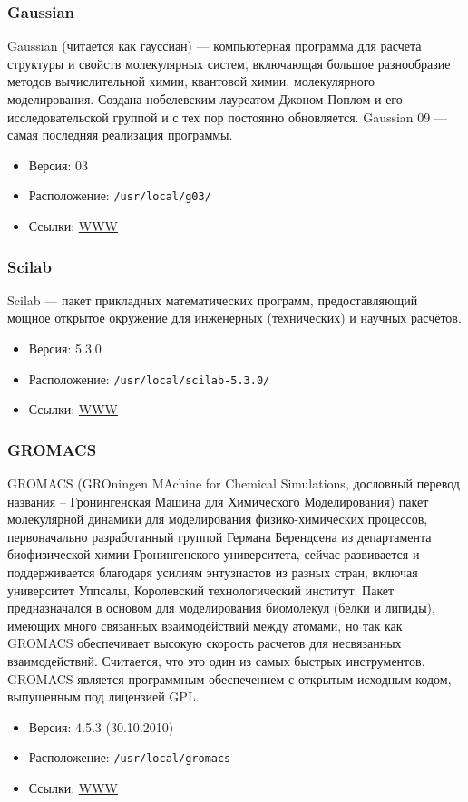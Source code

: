 \documentclass[a4paper,8pt]{extreport}
\begin{document}
\subsubsection{Gaussian}
Gaussian (читается как гауссиан) — компьютерная программа для расчета структуры и свойств молекулярных 
систем, включающая большое разнообразие методов вычислительной химии, квантовой химии, молекулярного 
моделирования. Создана нобелевским лауреатом Джоном Поплом и его исследовательской группой и с тех пор 
постоянно обновляется. Gaussian 09 — самая последняя реализация программы.
\begin{itemize}
 \item Версия: 03
 \item Расположение: \verb|/usr/local/g03/|
 \item Ссылки: \href{http://www.gaussian.com/}{WWW}
\end{itemize}

\subsubsection{Scilab}
Scilab — пакет прикладных математических программ, предоставляющий мощное открытое окружение для
инженерных (технических) и научных расчётов.
\begin{itemize}
 \item Версия: 5.3.0
 \item Расположение: \verb|/usr/local/scilab-5.3.0/|
 \item Ссылки: \href{http://www.scilab.org/}{WWW}
\end{itemize}

\subsubsection{GROMACS}
GROMACS (GROningen MAchine for Chemical Simulations, дословный перевод названия -- Гронингенская 
Машина для Химического Моделирования) пакет молекулярной динамики для моделирования физико-химических 
процессов, первоначально разработанный группой Германа Берендсена из департамента биофизической химии 
Гронингенского университета, сейчас развивается и поддерживается благодаря усилиям энтузиастов из разных 
стран, включая университет Уппсалы, Королевский технологический институт. Пакет предназначался в основом 
для моделирования биомолекул (белки и липиды), имеющих много связанных взаимодействий между атомами, но 
так как GROMACS обеспечивает высокую скорость расчетов для несвязанных взаимодействий. Считается, что 
это один из самых быстрых инструментов. GROMACS является программным обеспечением с открытым исходным 
кодом, выпущенным под лицензией GPL.
\begin{itemize}
 \item Версия: 4.5.3 (30.10.2010)
 \item Расположение: \verb|/usr/local/gromacs|
 \item Ссылки: \href{http://www.gromacs.org/}{WWW}
\end{itemize}
\end{document}

